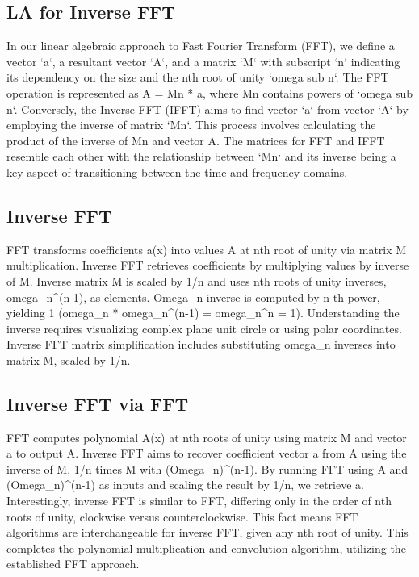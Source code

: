 \subsection*{LA for Inverse FFT}
In our linear algebraic approach to Fast Fourier Transform (FFT), we define a vector `a`, a resultant vector `A`, and a matrix `M` with subscript `n` indicating its dependency on the size and the nth root of unity `omega sub n`.
The FFT operation is represented as A = Mn * a, where Mn contains powers of `omega sub n`.
Conversely, the Inverse FFT (IFFT) aims to find vector `a` from vector `A` by employing the inverse of matrix `Mn`.
This process involves calculating the product of the inverse of Mn and vector A\@.
The matrices for FFT and IFFT resemble each other with the relationship between `Mn` and its inverse being a key aspect of transitioning between the time and frequency domains.

\subsection*{Inverse FFT}
FFT transforms coefficients a(x) into values A at nth root of unity via matrix M multiplication.
Inverse FFT retrieves coefficients by multiplying values by inverse of M\@.
Inverse matrix M is scaled by 1/n and uses nth roots of unity inverses, omega\_n\textasciicircum{}(n-1), as elements.
Omega\_n inverse is computed by n-th power, yielding 1 (omega\_n * omega\_n\textasciicircum{}(n-1) = omega\_n\textasciicircum{}n = 1).
Understanding the inverse requires visualizing complex plane unit circle or using polar coordinates.
Inverse FFT matrix simplification includes substituting omega\_n inverses into matrix M, scaled by 1/n.

\subsection*{Inverse FFT via FFT}
FFT computes polynomial A(x) at nth roots of unity using matrix M and vector a to output A\@.
Inverse FFT aims to recover coefficient vector a from A using the inverse of M, 1/n times M with (Omega\_n)\textasciicircum{}(n-1).
By running FFT using A and (Omega\_n)\textasciicircum{}(n-1) as inputs and scaling the result by 1/n, we retrieve a.
Interestingly, inverse FFT is similar to FFT, differing only in the order of nth roots of unity, clockwise versus counterclockwise.
This fact means FFT algorithms are interchangeable for inverse FFT, given any nth root of unity.
This completes the polynomial multiplication and convolution algorithm, utilizing the established FFT approach.

